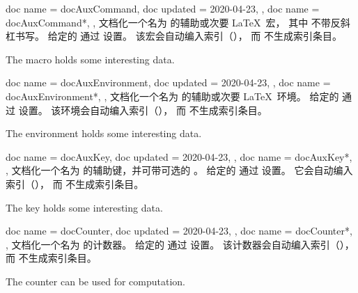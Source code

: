 \begin{docCommands}[doc parameter oarg marg={options}{name}]
  {
    {
      doc name    = docAuxCommand,
      doc updated = 2020-04-23,
    },
    {
      doc name = docAuxCommand*,
    },
  }
  文档化一个名为  的辅助或次要 \LaTeX\ 宏，
  其中  不带反斜杠书写。
  给定的  通过  设置。
  该宏会自动编入索引（），
  而  不生成索引条目。
\begin{dispExample}
The macro  holds some interesting data.
\end{dispExample}
\end{docCommands}



\begin{docCommands}[doc parameter oarg marg={options}{name}]
  {
    {
      doc name    = docAuxEnvironment,
      doc updated = 2020-04-23,
    },
    {
      doc name = docAuxEnvironment*,
    },
  }
  文档化一个名为  的辅助或次要 \LaTeX\ 环境。
  给定的  通过  设置。
  该环境会自动编入索引（），
  而  不生成索引条目。
\begin{dispExample}
The environment  holds some interesting data.
\end{dispExample}
\end{docCommands}


\begin{docCommands}[doc parameter=\oarg{key path}\oarg{options}\marg{name}]
  {
    {
      doc name    = docAuxKey,
      doc updated = 2020-04-23,
    },
    {
      doc name = docAuxKey*,
    },
  }
  文档化一个名为  的辅助键，并可带可选的 。
  给定的  通过  设置。
  它会自动编入索引（），
  而  不生成索引条目。
\begin{dispExample}
The key  holds some interesting data.
\end{dispExample}
\end{docCommands}



\begin{docCommands}[doc parameter oarg marg={options}{name}]
  {
    {
      doc name    = docCounter,
      doc updated = 2020-04-23,
    },
    {
      doc name = docCounter*,
    },
  }
  文档化一个名为  的计数器。
  给定的  通过  设置。
  该计数器会自动编入索引（），
  而  不生成索引条目。
\begin{dispExample}
The counter  can be used for computation.
\end{dispExample}
\end{docCommands}



